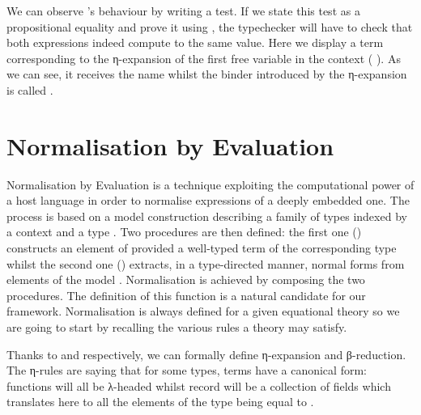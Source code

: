 
We can observe 's behaviour by writing a test.
If we state this test as a propositional equality and prove it using ,
the typechecker will have to check that both expressions indeed compute
to the same value. Here we display a term corresponding to the η-expansion
of the first free variable in the context   (  ).
As we can see, it receives the name  whilst the binder introduced by
the η-expansion is called .


\section{Normalisation by Evaluation}

Normalisation by Evaluation is a technique exploiting the computational
power of a host language in order to normalise expressions of a deeply
embedded one. The process is based on a model construction describing a
family of types  indexed by a context  and a type . Two
procedures are then defined: the first one () constructs an element
of    provided a well-typed term of the corresponding
   type whilst the second one () extracts, in
a type-directed manner, normal forms    from elements
of the model   . Normalisation is achieved by composing
the two procedures. The definition of this  function is a natural
candidate for our  framework. Normalisation is always defined
for a given equational theory so we are going to start by recalling the
various rules a theory may satisfy.

Thanks to  and  respectively, we can formally
define η-expansion and β-reduction. The η-rules are saying that for some types,
terms have a canonical form: functions will all be λ-headed whilst record will
be a collection of fields which translates here to all the elements of the
 type being equal to .

\noindent\begin{minipage}[t]{0.50\textwidth}
\end{minipage}
\begin{minipage}[t]{0.50\textwidth}
\end{minipage}

